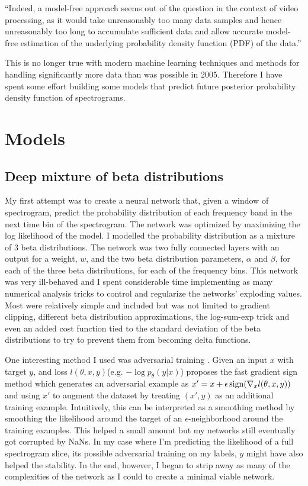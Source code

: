 
``Indeed, a model-free approach seems out of the question in the context of video processing, as it would take unreasonably too many data samples and hence unreasonably too long to accumulate sufficient data and allow accurate model-free estimation of the underlying probability density function (PDF) of the data.'' \cite{itti2005principled}

This is no longer true with modern machine learning techniques and methods for handling significantly more data than was possible in 2005. Therefore I have spent some effort building some models that predict future posterior probability density function of spectrograms.

\section{Models}

\subsection{Deep mixture of beta distributions}
My first attempt was to create a neural network that, given a window of spectrogram, predict the probability distribution of each frequency band in the next time bin of the spectrogram. The network was optimized by maximizing the log likelihood of the model. I modelled the probability distribution as a mixture of 3 beta distributions. The network was two fully connected layers with an output for a weight, $w$, and the two beta distribution parameters, $\alpha$ and $\beta$, for each of the three beta distributions, for each of the frequency bins. This network was very ill-behaved and I spent considerable time implementing as many numerical analysis tricks to control and regularize the networks' exploding values. Most were relatively simple and included but was not limited to gradient clipping, different beta distribution approximations, the log-sum-exp trick and even an added cost function tied to the standard deviation of the beta distributions to try to prevent them from becoming delta functions.

One interesting method I used was adversarial training \cite{goodfellow2014explaining,lakshminarayanan2017simple}. Given an input $x$ with target $y$, and loss $l(\theta, x, y)$(e.g. $-\log p_\theta(y|x)$) \cite{goodfellow2014explaining} proposes the fast gradient sign method which generates an adversarial example as $x' = x + \epsilon \operatorname{sign}(\nabla_x l(\theta, x, y))$ and using $x'$ to augment the dataset by treating $(x', y)$ as an additional training example. Intuitively, this can be interpreted as a smoothing method by smoothing the likelihood around the target of an $\epsilon$-neighborhood around the training examples. This helped a small amount but my networks still eventually got corrupted by NaNs. In my case where I'm predicting the likelihood of a full spectrogram slice, its possible adversarial training on my labels, $y$ might have also helped the stability. In the end, however, I began to strip away as many of the complexities of the network as I could to create a minimal viable network.

